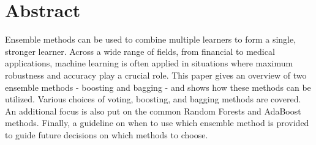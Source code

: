 \section*{Abstract}
Ensemble methods can be used to combine multiple learners to form a single, stronger learner. Across a wide range of fields, from financial to medical applications, machine learning is often applied in situations where maximum robustness and accuracy play a crucial role. This paper gives an overview of two ensemble methods - boosting and bagging - and shows how these methods can be utilized. Various choices of voting, boosting, and bagging methods are covered. An additional focus is also put on the common Random Forests and AdaBoost methods. Finally, a guideline on when to use which ensemble method is provided to guide future decisions on which methods to choose.